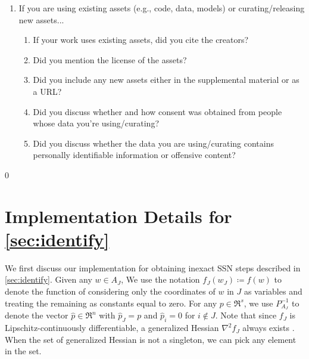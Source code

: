 \documentclass{article}
\theoremstyle{plain}
\theoremstyle{definition}
\theoremstyle{remark}
\begin{document}
\begin{enumerate}
	\item If you are using existing assets (e.g., code, data, models) or 
	curating/releasing new assets...
	\begin{enumerate}
		\item If your work uses existing assets, did you cite the creators?
		\item Did you mention the license of the assets?
		\answerNA
		\item Did you include any new assets either in the supplemental 
		material or as a URL?
		\item Did you discuss whether and how consent was obtained from people 
		whose data you're using/curating?
		\item Did you discuss whether the data you are using/curating contains 
		personally identifiable information or offensive content?
	\end{enumerate}
	
\end{enumerate}
\fi



\newpage
\appendix
\startcontents
\begin{spacing}{0}
\end{spacing}

\section{Implementation Details for \cref{sec:identify}}
\label{subsec:ssn}
We first discuss our implementation for obtaining inexact SSN steps
described in \cref{sec:identify}.
Given any $w \in A_J$,
We use the notation $f_{J}(w_J) \coloneqq f(w)$ to denote the function
of considering only the coordinates of $w$ in $J$ as variables and
treating the remaining as constants equal to zero. For any $p \in \Re^s$, we
use $P^{-1}_{A_J}$ to denote the vector
$\hat p \in \Re^n$ with $\hat p_{J} = p$ and $\hat p_i = 0$ for $i
\notin J$.
Note that since $f_{J}$ is Lipschitz-continuously differentiable,
a generalized Hessian $\nabla^2 f_{J}$ always exists \cite{HUJ84a}.
When the set of generalized Hessian is not a singleton, we can pick
any element in the set.
\end{document}
